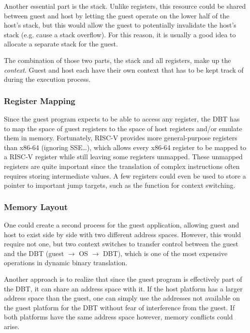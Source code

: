 		Another essential part is the stack. Unlike registers, this resource could be shared between guest and host by letting the guest operate on the lower half of the host's stack, but this would allow the guest to potentially invalidate the host's stack (e.g. cause a stack overflow). For this reason, it is usually a good idea to allocate a separate stack for the guest.
		
		The combination of those two parts, the stack and all registers, make up the \emph{context}. Guest and host each have their own context that has to be kept track of during the execution process.
		
	\subsubsection{Register Mapping}
	\label{register_mapping}
		Since the guest program expects to be able to access any register, the DBT has to map the space of guest registers to the space of host registers and/or emulate them in memory. Fortunately, RISC-V provides more general-purpose registers than x86-64 (ignoring SSE\dots), which allows every x86-64 register to be mapped to a RISC-V register while still leaving some registers unmapped. These unmapped registers are quite important since the translation of complex instructions often requires storing intermediate values. A few registers could even be used to store a pointer to important jump targets, such as the function for context switching.
		
	\subsubsection{Memory Layout}
		One could create a second process for the guest application, allowing guest and host to exist side by side with two different address spaces. However, this would require not one, but two context switches to transfer control between the guest and the DBT (guest \(\rightarrow\) OS \(\rightarrow\) DBT), which is one of the most expensive operations in dynamic binary translation.
		
		Another approach is to realize that since the guest program is effectively part of the DBT, it can share an address space with it. If the host platform has a larger address space than the guest, one can simply use the addresses not available on the guest platform for the DBT without fear of interference from the guest. If both platforms have the same address space however, memory conflicts could arise.
		
